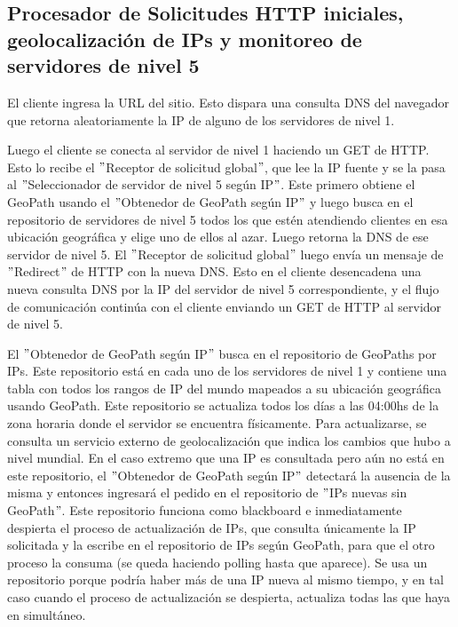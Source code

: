 \subsection{Procesador de Solicitudes HTTP iniciales, geolocalización de IPs y monitoreo de servidores de nivel 5}


El cliente ingresa la URL del sitio. Esto dispara una consulta DNS del navegador
que retorna aleatoriamente la IP de alguno de los servidores de nivel 1.

Luego el cliente se conecta al servidor de nivel 1 haciendo un GET de HTTP. Esto
lo recibe el $"$Receptor de solicitud global$"$, que lee la IP fuente y se la pasa al
$"$Seleccionador de servidor de nivel 5 según IP$"$. Este primero obtiene el GeoPath
usando el $"$Obtenedor de GeoPath según IP$"$ y luego busca en el repositorio de servidores
de nivel 5 todos los que estén atendiendo clientes en esa ubicación geográfica y elige uno
de ellos al azar. Luego retorna la DNS de ese servidor de nivel 5. El $"$Receptor de solicitud
global$"$ luego envía un mensaje de $"$Redirect$"$ de HTTP con la nueva DNS. Esto en el cliente
desencadena una nueva consulta DNS por la IP del servidor de nivel 5 correspondiente, y el
flujo de comunicación continúa con el cliente enviando un GET de HTTP al servidor de nivel 5.

El $"$Obtenedor de GeoPath según IP$"$ busca en el repositorio de GeoPaths por IPs. Este
repositorio está en cada uno de los servidores de nivel 1 y contiene una tabla con todos los
rangos de IP del mundo mapeados a su ubicación geográfica usando GeoPath. Este repositorio
se actualiza todos los días a las 04:00hs de la zona horaria donde el servidor se encuentra
físicamente. Para actualizarse, se consulta un servicio externo de geolocalización que indica los
cambios que hubo a nivel mundial. En el caso extremo que una IP es consultada pero aún no
está en este repositorio, el $"$Obtenedor de GeoPath según IP$"$ detectará la ausencia de la misma
y entonces ingresará el pedido en el repositorio de $"$IPs nuevas sin GeoPath$"$. Este repositorio
funciona como blackboard e inmediatamente despierta el proceso de actualización de IPs,
que consulta únicamente la IP solicitada y la escribe en el repositorio de IPs según GeoPath, para
que el otro proceso la consuma (se queda haciendo polling hasta que aparece). Se usa un
repositorio porque podría haber más de una IP nueva al mismo tiempo, y en tal caso cuando el proceso
de actualización se despierta, actualiza todas las que haya en simultáneo.

